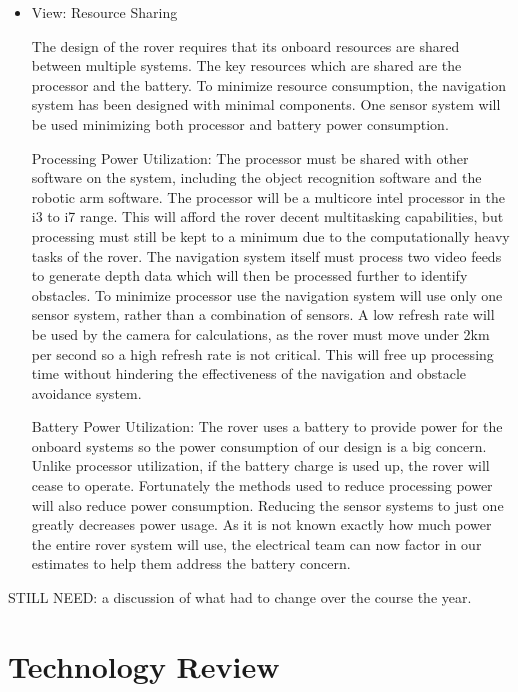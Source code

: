 \documentclass[10pt, oneside,onecolumn]{IEEEtran}
\begin{document}
\begin{itemize}

\item View: Resource Sharing

The design of the rover requires that its onboard resources are shared between multiple systems. The key resources which are shared are the processor and the battery. To minimize resource consumption, the navigation system has been designed with minimal components. One sensor system will be used minimizing both processor and battery power consumption.

\subitem Processing Power Utilization: The processor must be shared with other software on the system, including the object recognition software and the robotic arm software. The processor will be a multicore intel processor in the i3 to i7 range. This will afford the rover decent multitasking capabilities, but processing must still be kept to a minimum due to the computationally heavy tasks of the rover. The navigation system itself must process two video feeds to generate depth data which will then be processed further to identify obstacles. To minimize processor use the navigation system will use only one sensor system, rather than a combination of sensors. A low refresh rate will be used by the camera for calculations, as the rover must move under 2km per second so a  high refresh rate is not critical. This will free up processing time without hindering the effectiveness of the navigation and obstacle avoidance system.

\subitem Battery Power Utilization: The rover uses a battery to provide power for the onboard systems so the power consumption of our design is a big concern. Unlike processor utilization, if the battery charge is used up, the rover will cease to operate. Fortunately the methods used to reduce processing power will also reduce power consumption. Reducing the sensor systems to just one greatly decreases power usage. As it is not known exactly how much power the entire rover system will use, the electrical team can now factor in our estimates to help them address the battery concern. 

\end{itemize}

STILL NEED: a discussion of what had to change over the course the year.

\section{Technology Review}
\end{document}

